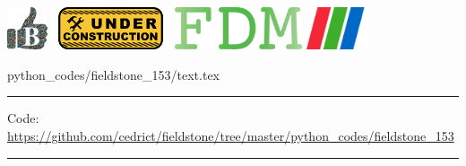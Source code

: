 \noindent
\includegraphics[height=1.25cm]{images/pictograms/benchmark}
\includegraphics[height=1.25cm]{images/pictograms/under_construction}
\includegraphics[height=1.25cm]{images/pictograms/FDM}
\includegraphics[height=1.25cm]{images/pictograms/paraview}



\begin{flushright} {\tiny {\color{gray} python\_codes/fieldstone\_153/text.tex}} \end{flushright}

%

\par\noindent\rule{\textwidth}{0.4pt}

\begin{center}
\inpython
{\small Code: \url{https://github.com/cedrict/fieldstone/tree/master/python_codes/fieldstone_153}}
\end{center}

\par\noindent\rule{\textwidth}{0.4pt}






